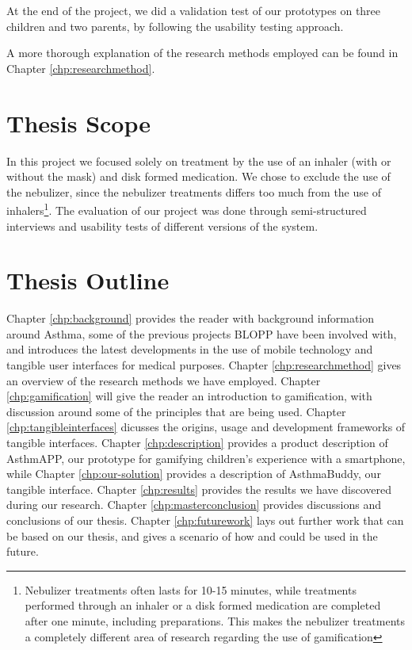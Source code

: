 At the end of the project, we did a validation test of our prototypes on three children and two parents, by following the usability testing approach. 

A more thorough explanation of the research methods employed can be found in Chapter \ref{chp:researchmethod}. 


\section{Thesis Scope}
\label{sec:thesis scope}
In this project we focused solely on treatment by the use of an inhaler (with or without the mask) and disk formed medication. We chose to exclude the use of the nebulizer, since the nebulizer treatments differs too much from the use of inhalers\footnote{Nebulizer treatments often lasts for 10-15 minutes, while treatments performed through an inhaler or a disk formed medication are completed after one minute, including preparations. This makes the nebulizer treatments a completely different area of research regarding the use of gamification}.
The evaluation of our project was done through semi-structured interviews and usability tests of different versions of the system.


\section{Thesis Outline}
\label{sec:thesisoutline}
Chapter \ref{chp:background} provides the reader with background information around Asthma, some of the previous projects BLOPP have been involved with, and introduces the latest developments in the use of mobile technology and tangible user interfaces for medical purposes.
Chapter \ref{chp:researchmethod} gives an overview of the research methods we have employed.  
Chapter \ref{chp:gamification} will give the reader an introduction to gamification, with discussion around some of the principles that are being used. 
Chapter \ref{chp:tangibleinterfaces} dicusses the origins, usage and development frameworks of tangible interfaces.
Chapter \ref{chp:description} provides a product description of AsthmAPP, our prototype for gamifying children's experience with a smartphone, while Chapter \ref{chp:our-solution} provides a description of AsthmaBuddy, our tangible interface.
Chapter \ref{chp:results} provides the results we have discovered during our research.
Chapter \ref{chp:masterconclusion} provides discussions and conclusions of our thesis.
Chapter \ref{chp:futurework} lays out further work that can be based on our thesis, and gives a scenario of how \ab{} and \app{} could be used in the future.            
